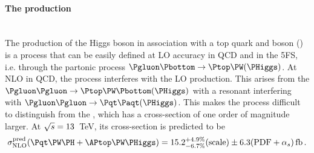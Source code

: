 \paragraph{The \tWH production}\mbox{}\\

The production of the Higgs boson in association with a top quark and \PW boson
(\tWH) is a process that can be easily defined at LO accuracy in QCD and in the 5FS, i.e. 
through the partonic process $\Pgluon \Pbottom \rightarrow \Ptop \PW (\PHiggs)$\cite{Demartin:2016axk}.
At NLO in QCD, the \tWH process interferes with the LO \ttH production.
This arises from the $\Pgluon \Pgluon \rightarrow \Ptop \PW \Pbottom (\PHiggs)$
with a resonant \APtop interfering with $\Pgluon \Pgluon \rightarrow \ttbar (\PHiggs)$.
This makes the \tWH process difficult to distinguish from the \ttH, which has a 
cross-section of one order of magnitude larger. 
At $\sqrt{s}=13$~TeV, its cross-section is predicted to be
\begin{equation*}
	\sigma_{\text{NLO}}^{\text{pred}} (\tWH + \APtop\PW\PHiggs) = 15.2^{+4.9\%}_{-6.7\%}(\text{scale}) \pm 6.3 (\text{PDF}+\alpha_{s}) \,\text{fb}\,.
\end{equation*}


\begin{comment}
\begin{figure}
\centering
\begin{subfigure}{.4\textwidth}
  \centering
  \texttt{[image: Chapter1/tW\_A]}
  \caption{}
  \label{fig:Chap1:tH:tWH:A}
\end{subfigure}%
\begin{subfigure}{.4\textwidth}
  \centering
  \texttt{[image: Chapter1/tW\_B]}
  \caption{}
  \label{fig:Chap1:tH:tWH:B}
\end{subfigure}%
\caption{LO Feynman diagrams for \tW production in the 5FS.}
\label{fig:Chap1:tH:tW}
\end{figure}
\end{comment}

